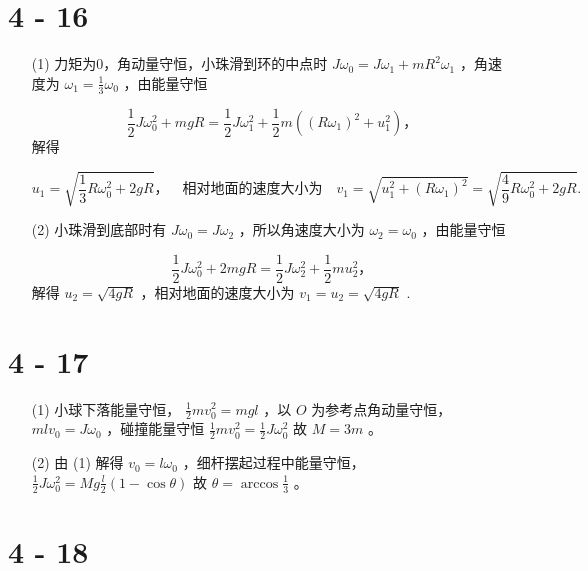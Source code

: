 \documentclass{article}
\begin{document}
\section*{4 - 16}

\begin{itemize}
    \item [(1)] 力矩为0，角动量守恒，小珠滑到环的中点时  $ J\omega_0 = J\omega_1 + mR^2\omega_1 $ ，角速度为  $ \omega_1 = \frac{1}{3}\omega_0 $ ，由能量守恒
    
 $$
    \frac{1}{2} J\omega_0^2 + mgR = \frac{1}{2} J\omega_1^2 + \frac{1}{2} m((R\omega_1)^2 + u_1^2)，
    $$ 
    解得
    
 $$
    u_1 = \sqrt{\frac{1}{3} R\omega_0^2 + 2gR}，\quad \text{相对地面的速度大小为} \quad v_1 = \sqrt{u_1^2 + (R\omega_1)^2} = \sqrt{\frac{4}{9} R\omega_0^2 + 2gR}.
    $$ 
    \item [(2)] 小珠滑到底部时有  $ J\omega_0 = J\omega_2 $ ，所以角速度大小为  $ \omega_2 = \omega_0 $ ，由能量守恒
    
 $$
    \frac{1}{2} J\omega_0^2 + 2mgR = \frac{1}{2} J\omega_2^2 + \frac{1}{2} mu_2^2，
    $$ 
    解得  $ u_2 = \sqrt{4gR} $ ，相对地面的速度大小为  $ v_1 = u_2 = \sqrt{4gR} $ .
\end{itemize}

\section*{4 - 17}

\begin{itemize}
    \item [(1)] 小球下落能量守恒， $\frac{1}{2}mv_0^2 = mgl$ ，以  $O$  为参考点角动量守恒， $mlv_0 = J\omega_0$ ，碰撞能量守恒  $\frac{1}{2}mv_0^2 = \frac{1}{2}J\omega_0^2$ 故  $M = 3m$ 。
    \item [(2)] 由 (1) 解得  $v_0 = l\omega_0$ ，细杆摆起过程中能量守恒， $\frac{1}{2}J\omega_0^2 = Mg\frac{l}{2}(1-\cos\theta)$ 故  $\theta = \arccos\frac{1}{3}$ 。
\end{itemize}

\section*{4 - 18}
\end{document}

